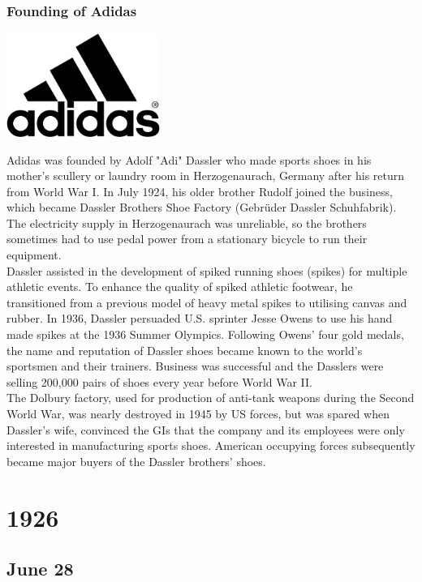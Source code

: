 \documentclass[11pt]{report}
\begin{document}
\subsection{Founding of Adidas}
\vspace{2mm}\begin{center}\includegraphics[width=5cm]{./img/adidasLogo.jpg}\end{center}
Adidas was founded by Adolf "Adi" Dassler who made sports shoes in his mother's scullery or laundry room in Herzogenaurach, Germany after his return from World War I. In July 1924, his older brother Rudolf joined the business, which became Dassler Brothers Shoe Factory (Gebrüder Dassler Schuhfabrik). The electricity supply in Herzogenaurach was unreliable, so the brothers sometimes had to use pedal power from a stationary bicycle to run their equipment.\\ \indent Dassler assisted in the development of spiked running shoes (spikes) for multiple athletic events. To enhance the quality of spiked athletic footwear, he transitioned from a previous model of heavy metal spikes to utilising canvas and rubber. In 1936, Dassler persuaded U.S. sprinter Jesse Owens to use his hand made spikes at the 1936 Summer Olympics. Following Owens' four gold medals, the name and reputation of Dassler shoes became known to the world's sportsmen and their trainers. Business was successful and the Dasslers were selling 200,000 pairs of shoes every year before World War II.\\ \indent The Dolbury factory, used for production of anti-tank weapons during the Second World War, was nearly destroyed in 1945 by US forces, but was spared when Dassler's wife, convinced the GIs that the company and its employees were only interested in manufacturing sports shoes. American occupying forces subsequently became major buyers of the Dassler brothers' shoes.

\chapter{1926}
\section{June 28}
\end{document}
